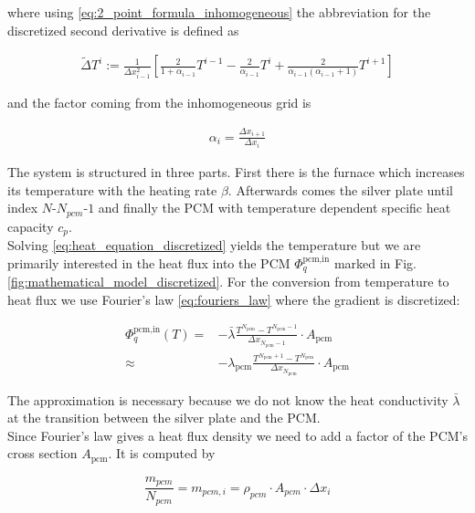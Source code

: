 \documentclass{scrartcl}[12pt, halfparskip]
\numberwithin{equation}{section}
\numberwithin{figure}{section}
\numberwithin{table}{section}
\begin{document}
where using \eqref{eq:2_point_formula_inhomogeneous} the abbreviation for the discretized second derivative is defined as

\begin{align}
	\tilde{\Delta} T^i := \frac{1}{\Delta x_{i-1}^2} \left[ \frac{2}{1+\alpha_{i-1}} T^{i-1} - \frac{2}{\alpha_{i-1}} T^{i} + \frac{2}{\alpha_{i-1} (\alpha_{i-1} + 1)} T^{i+1} \right]
\end{align}

and the factor coming from the inhomogeneous grid is

\begin{align}
	\alpha_i = \frac{\Delta x_{i+1}}{\Delta x_{i}}
\end{align}

The system is structured in three parts. First there is the furnace which increases its temperature with the heating rate $\beta$. Afterwards comes the silver plate until index $N$-$N_{pcm}$-$1$ and finally the PCM with temperature dependent specific heat capacity $c_p$. \\

Solving \eqref{eq:heat_equation_discretized} yields the temperature but we are primarily interested in the heat flux into the PCM $\varPhi_{q}^{\text{pcm,in}}$ marked in Fig. \ref{fig:mathematical_model_discretized}. For the conversion from temperature to heat flux we use Fourier's law \eqref{eq:fouriers_law} where the gradient is discretized:

\begin{align}
	\varPhi_{q}^{\text{pcm,in}}(T) = & - \bar{\lambda} \frac{T^{N_{\text{pcm}}} - T^{N_{\text{pcm}}-1}}{\Delta x_{N_{\text{pcm}}-1}} \cdot A_{\text{pcm}} \\
	\approx & - \lambda_{\text{pcm}} \frac{T^{N_{\text{pcm}}+1} - T^{N_{\text{pcm}}}}{\Delta x_{N_{\text{pcm}}}} \cdot A_{\text{pcm}} \nonumber
\end{align}

The approximation is necessary because we do not know the heat conductivity $\bar{\lambda}$ at the transition between the silver plate and the PCM. \\
Since Fourier's law gives a heat flux density we need to add a factor of the PCM's cross section $A_{\text{pcm}}$. It is computed by

\begin{equation}
	\frac{m_{pcm}}{N_{pcm}} = m_{pcm,i} = \rho_{pcm} \cdot A_{pcm} \cdot \Delta x_i 
\end{equation}
\end{document}

